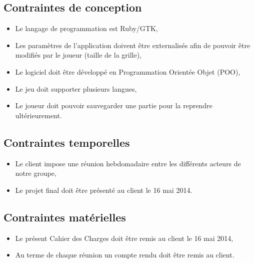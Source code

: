 \documentclass[11pt]{article}
\begin{document}
\subsection{Contraintes de conception}


\begin{itemize}
   \item Le langage de programmation est Ruby/GTK,
   \item Les paramètres de l’application doivent être externalisés afin de pouvoir être modifiés par le joueur (taille
       de la grille),
   \item Le logiciel doit être développé en Programmation Orientée Objet (POO),
   \item Le jeu doit supporter plusieurs langues,
   \item Le joueur doit pouvoir sauvegarder une partie pour la reprendre ultérieurement.
\end{itemize}




\subsection{Contraintes temporelles}


\begin{itemize}
    \item Le client impose une réunion hebdomadaire entre les différents acteurs de notre groupe,
    \item Le projet final doit être présenté au client le 16 mai 2014.
\end{itemize}




\subsection{Contraintes matérielles}


\begin{itemize}
    \item Le présent Cahier des Charges doit être remis au client le 16 mai 2014,
    \item Au terme de chaque réunion un compte rendu doit être remis au client.
\end{itemize}


\end{document}
